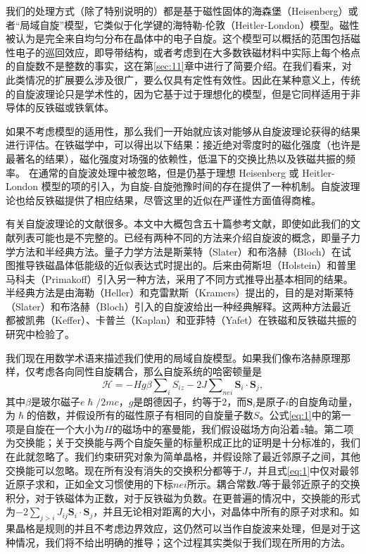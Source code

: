 \documentclass{article}
\begin{document}
我们的处理方式（除了特别说明的）都是基于磁性固体的海森堡（Heisenberg）或者“局域自旋”模型，它类似于化学键的海特勒-伦敦（Heitler-London）模型。磁性被认为是完全来自均匀分布在晶体中的电子自旋。这个模型可以概括的范围包括磁性电子的巡回效应，即导带结构，或者考虑到在大多数铁磁材料中实际上每个格点的自旋数不是整数的事实，这在第\ref{sec:11}章中进行了简要介绍。在我们看来，对此类情况的扩展要么涉及很广，要么仅具有定性有效性。因此在某种意义上，传统的自旋波理论只是学术性的，因为它基于过于理想化的模型，但是它同样适用于非导体的反铁磁或铁氧体。

如果不考虑模型的适用性，那么我们一开始就应该对能够从自旋波理论获得的结果进行评估。在铁磁学中，可以得出以下结果：接近绝对零度时的磁化强度（也许是最著名的结果），磁化强度对场强的依赖性，低温下的交换比热以及铁磁共振的频率。 在通常的自旋波处理中被忽略，但是仍基于理想 Heisenberg 或 Heitler-London 模型的项的引入，为自旋-自旋弛豫时间的存在提供了一种机制。自旋波理论也给反铁磁提供了相应结果，尽管这里的近似在严谨性方面值得商榷。

有关自旋波理论的文献很多。本文中大概包含五十篇参考文献，即使如此我们的文献列表可能也是不完整的。已经有两种不同的方法来介绍自旋波的概念，即量子力学方法和半经典方法。量子力学方法是斯莱特（Slater）和布洛赫（Bloch）在试图推导铁磁晶体低能级的近似表达式时提出的。后来由荷斯坦（Holstein）和普里马科夫（Primakoff）引入另一种方法，采用了不同方式推导出基本相同的结果。半经典方法是由海勒（Heller）和克雷默斯（Kramers）提出的，目的是对斯莱特（Slater）和布洛赫（Bloch）引入的自旋波给出一种经典解释。这两种方法最近都被凯弗（Keffer）、卡普兰（Kaplan）和亚菲特（Yafet）在铁磁和反铁磁共振的研究中检验了。

我们现在用数学术语来描述我们使用的局域自旋模型。如果我们像布洛赫原理那样，仅考虑各向同性自旋耦合，那么自旋系统的哈密顿量是
\begin{equation} \label{eq:1}
\mathcal{H}=-Hg\beta\sum\nolimits_iS_{iz}-2J\sum\nolimits_{\mathit{nei}}\mathbf{S}_{i}\cdot \mathbf{S}_{j},
\end{equation}
其中$\beta$是玻尔磁子$e\hslash/2mc$，$g$是朗德因子，约等于$2$，而$\mathbf{S}_i$是原子$i$的自旋角动量，为$\hslash$的倍数，并假设所有的磁性原子有相同的自旋量子数$S$。公式\eqref{eq:1}中的第一项是自旋在一个大小为$H$的磁场中的塞曼能，我们假设磁场方向沿着$z$轴。第二项为交换能；关于交换能与两个自旋矢量的标量积成正比的证明是十分标准的，我们在此就忽略了。我们约束研究对象为简单晶格，并假设除了最近邻原子之间，其他交换能可以忽略。现在所有没有消失的交换积分都等于$J$，并且式\eqref{eq:1}中仅对最邻近原子求和，正如全文习惯使用的下标$\mathit{nei}$所示。耦合常数$J$等于最邻近原子的交换积分，对于铁磁体为正数，对于反铁磁为负数。在更普遍的情况中，交换能的形式为$-2\sum_{j>i}J_{ij}\mathbf{S}_i\cdot\mathbf{S}_j$，并且无论相对距离的大小，对晶体中所有的原子对求和。如果晶格是规则的并且不考虑边界效应，这仍然可以当作自旋波来处理，但是对于这种情况，我们将不给出明确的推导；这个过程其实类似于我们现在所用的方法。
\end{document}
